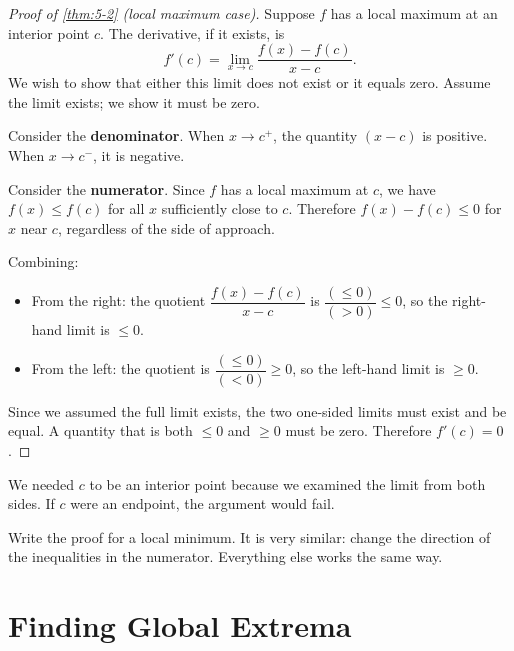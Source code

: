 \begin{proof}[Proof of \cref{thm:5-2} (local maximum case)]
Suppose $f$ has a local maximum at an interior point $c$.  The derivative, if it exists, is
\[
  f'(c) = \lim_{x \to c} \frac{f(x) - f(c)}{x - c}.
\]
We wish to show that either this limit does not exist or it equals zero.  Assume the limit exists; we show it must be zero.


Consider the \textbf{denominator}.  When $x \to c^{+}$, the quantity $(x - c)$ is positive.  When $x \to c^{-}$, it is negative.

Consider the \textbf{numerator}.  Since $f$ has a local maximum at $c$, we have $f(x) \leq f(c)$ for all $x$ sufficiently close to $c$.  Therefore $f(x) - f(c) \leq 0$ for $x$ near $c$, regardless of the side of approach.

Combining:
\begin{itemize}
  \item From the right: the quotient $\dfrac{f(x) - f(c)}{x - c}$ is $\dfrac{(\leq 0)}{(> 0)} \leq 0$, so the right-hand limit is $\leq 0$.
  \item From the left: the quotient is $\dfrac{(\leq 0)}{(< 0)} \geq 0$, so the left-hand limit is $\geq 0$.
\end{itemize}
Since we assumed the full limit exists, the two one-sided limits must exist and be equal.  A quantity that is both $\leq 0$ and $\geq 0$ must be zero.  Therefore $f'(c) = 0$.
\end{proof}

\begin{remark}
We needed $c$ to be an interior point because we examined the limit from both sides.  If $c$ were an endpoint, the argument would fail.
\end{remark}

\begin{remark}
Write the proof for a local minimum.  It is very similar: change the direction of the inequalities in the numerator.  Everything else works the same way.
\end{remark}

\section{Finding Global Extrema}
\label{sec:5.4}

